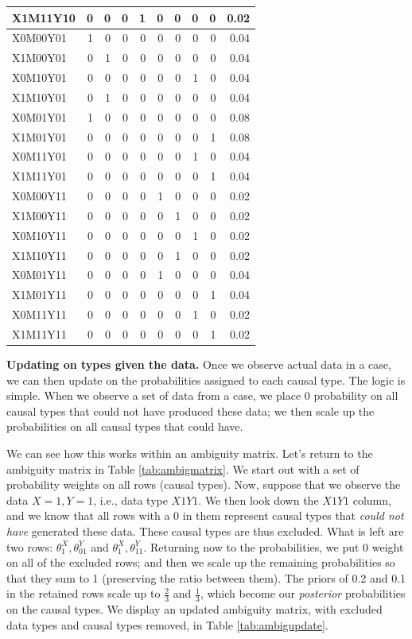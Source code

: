 \documentclass[12pt,]{book}
\begin{document}
\begin{table}[t]
\begin{tabular}{l|r|r|r|r|r|r|r|r|r}
\hline
X1M11Y10 & 0 & 0 & 0 & 1 & 0 & 0 & 0 & 0 & 0.02\\
\hline
X0M00Y01 & 1 & 0 & 0 & 0 & 0 & 0 & 0 & 0 & 0.04\\
\hline
X1M00Y01 & 0 & 1 & 0 & 0 & 0 & 0 & 0 & 0 & 0.04\\
\hline
X0M10Y01 & 0 & 0 & 0 & 0 & 0 & 0 & 1 & 0 & 0.04\\
\hline
X1M10Y01 & 0 & 1 & 0 & 0 & 0 & 0 & 0 & 0 & 0.04\\
\hline
X0M01Y01 & 1 & 0 & 0 & 0 & 0 & 0 & 0 & 0 & 0.08\\
\hline
X1M01Y01 & 0 & 0 & 0 & 0 & 0 & 0 & 0 & 1 & 0.08\\
\hline
X0M11Y01 & 0 & 0 & 0 & 0 & 0 & 0 & 1 & 0 & 0.04\\
\hline
X1M11Y01 & 0 & 0 & 0 & 0 & 0 & 0 & 0 & 1 & 0.04\\
\hline
X0M00Y11 & 0 & 0 & 0 & 0 & 1 & 0 & 0 & 0 & 0.02\\
\hline
X1M00Y11 & 0 & 0 & 0 & 0 & 0 & 1 & 0 & 0 & 0.02\\
\hline
X0M10Y11 & 0 & 0 & 0 & 0 & 0 & 0 & 1 & 0 & 0.02\\
\hline
X1M10Y11 & 0 & 0 & 0 & 0 & 0 & 1 & 0 & 0 & 0.02\\
\hline
X0M01Y11 & 0 & 0 & 0 & 0 & 1 & 0 & 0 & 0 & 0.04\\
\hline
X1M01Y11 & 0 & 0 & 0 & 0 & 0 & 0 & 0 & 1 & 0.04\\
\hline
X0M11Y11 & 0 & 0 & 0 & 0 & 0 & 0 & 1 & 0 & 0.02\\
\hline
X1M11Y11 & 0 & 0 & 0 & 0 & 0 & 0 & 0 & 1 & 0.02\\
\hline
\end{tabular}
\end{table}

\textbf{Updating on types given the data.} Once we observe actual data in a case, we can then update on the probabilities assigned to each causal type. The logic is simple. When we observe a set of data from a case, we place \(0\) probability on all causal types that could not have produced these data; we then scale up the probabilities on all causal types that could have.

We can see how this works within an ambiguity matrix. Let's return to the ambiguity matrix in Table \ref{tab:ambigmatrix}. We start out with a set of probability weights on all rows (causal types). Now, suppose that we observe the data \(X=1, Y=1\), i.e., data type \(X1Y1\). We then look down the \(X1Y1\) column, and we know that all rows with a \(0\) in them represent causal types that \emph{could not have} generated these data. These causal types are thus excluded. What is left are two rows: \(\theta^X_1, \theta^Y_{01}\) and \(\theta^X_1, \theta^Y_{11}\). Returning now to the probabilities, we put 0 weight on all of the excluded rows; and then we scale up the remaining probabilities so that they sum to 1 (preserving the ratio between them). The priors of 0.2 and 0.1 in the retained rows scale up to \(\frac{2}{3}\) and \(\frac{1}{3}\), which become our \emph{posterior} probabilities on the causal types. We display an updated ambiguity matrix, with excluded data types and causal types removed, in Table \ref{tab:ambigupdate}.
\end{document}
